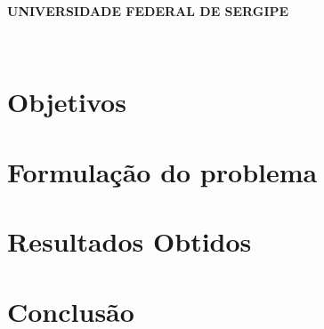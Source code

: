\documentclass[
12pt,				%
openright,			%
oneside,			%
a4paper,			%
english,			%
french,				%
spanish,			%
brazil,				%
]{abntex2}
\renewcommand{\imprimircapa}{%
	\begin{capa}%
		\center
		\ABNTEXchapterfont\Large \textbf{UNIVERSIDADE FEDERAL DE SERGIPE}
		\\
		\vspace*{1cm}
		{\ABNTEXchapterfont\large\imprimirautor}
		\vfill
		\begin{center}
			\ABNTEXchapterfont\bfseries\LARGE\imprimirtitulo
		\end{center}
		\vfill
		\large\imprimirlocal \\
		\large\imprimirdata
		\vspace*{1cm}
	\end{capa}
}
\begin{document}
	\lstset{language=Matlab} 
	\frenchspacing  %
	
	\imprimircapa
	
	\imprimirfolhaderosto*
	
	
	
	\listoffigures*
	\pagebreak

	\listoftables*
	\pagebreak
	
	\tableofcontents*
	\pagebreak
	
	
	
	
	
	
	\chapter{Objetivos}
	
	
	
	\chapter{Formulação do problema}
	
	\chapter{Resultados Obtidos}
	
	\chapter{Conclusão}
	
	
    \nocite{harrison2007aes,lu2002integrated,hamalainen2006design,oliveira2012criptografia,coutinho,stallings,burnett,dacriptografia}
    
	
	
	
\end{document}
